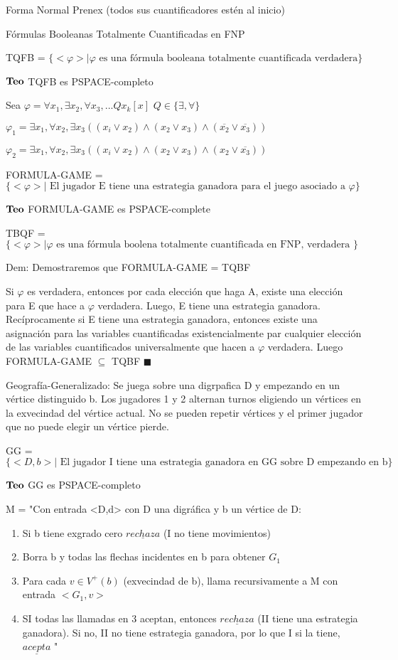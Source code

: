 \documentclass{homework}
\begin{document}
Forma Normal Prenex (todos sus cuantificadores estén al inicio)

Fórmulas Booleanas Totalmente Cuantificadas en FNP

TQFB =  $\{<\varphi> | \varphi \text{ es una fórmula booleana totalmente cuantificada verdadera} \}$

$\bf{Teo}$ TQFB es PSPACE-completo


Sea $\varphi = \forall x_1, \exists x_2, \forall x_3, ... Qx_k [x]$ $Q \in \{\exists, \forall\}$

$\varphi_1 = \exists x_1, \forall x_2, \exists x_3 ((x_i \vee x_2) \wedge (x_2 \vee  x_3) \wedge (\overline{x_2} \vee \overline{x_3}) )$

$\varphi_2 = \exists x_1, \forall x_2, \exists x_3 ((x_i \vee x_2) \wedge (x_2 \vee  x_3) \wedge (x_2 \vee \overline{x_3}) )$

FORMULA-GAME = $\{<\varphi>| \text{ El jugador E tiene una estrategia ganadora para el juego asociado a } \varphi\}$

$\bf{Teo}$ FORMULA-GAME es PSPACE-complete

TBQF = $\{<\varphi>| \varphi \text{ es una fórmula boolena totalmente cuantificada en FNP, verdadera }\}$

Dem: Demostraremos que FORMULA-GAME = TQBF

Si $\varphi$ es verdadera, entonces por cada elección que haga A, existe una elección para E que hace a $\varphi$ verdadera. Luego, E tiene una estrategia ganadora. Recíprocamente si E tiene una estrategia ganadora, entonces existe una asignación para las variables cuantificadas existencialmente par cualquier elección de las variables cuantificados universalmente que hacen a $\varphi$ verdadera. Luego FORMULA-GAME $\subseteq$ TQBF $\blacksquare$

Geografía-Generalizado: Se juega sobre una digrpafica D y empezando en un vértice distinguido b. Los jugadores 1 y 2 alternan turnos eligiendo un vértices en la exvecindad del vértice actual. No se pueden repetir vértices y el primer jugador que no puede elegir un vértice pierde.

GG = $\{<D,b> | \text{ El jugador I tiene una estrategia ganadora en GG sobre D empezando en b}\}$

$\bf{Teo}$ GG es PSPACE-completo

M = "Con entrada <D,d> con D una digráfica y b un vértice de D:
\begin{enumerate}
	\item Si b tiene exgrado cero $\underline{rechaza}$ (I no tiene movimientos)
	\item Borra b y todas las flechas incidentes en b para obtener $G_1$
	\item Para cada $v \in V^{+}(b)$ (exvecindad de b), llama recursivamente a M con entrada $<G_1, v>$ 
	\item SI todas las llamadas en 3 aceptan, entonces $\underline{rechaza}$ (II tiene una estrategia ganadora). Si no, II no tiene estrategia ganadora, por lo que I si la tiene, $\underline{acepta}$ "
\end{enumerate}
\end{document}
